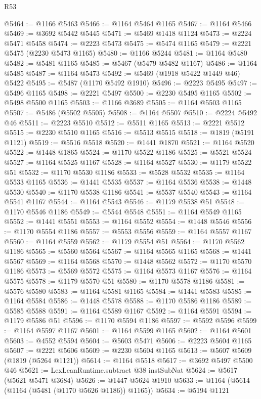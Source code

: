 \begin{lexlean}{R53}
\begin{coremodule}
@5464 := @1166 @5463
@5466 := @1164 @5464 @1165
@5467 := @1164 @5466
@5469 := @3692 @5442 @5445
@5471 := @5469 @1418 @1124
@5473 := @2224 @5471 @5458
@5474 := @2223 @5473
@5475 := @5474 @1165
@5479 := @2221 @5475 (@2230 @5473 @1165)
@5480 := @1166 @5244
@5481 := @1164 @5480
@5482 := @5481 @1165
@5485 := @5467 (@5479 @5482 @1167)
@5486 := @1164 @5485
@5487 := @1164 @5473
@5492 := @5469 (@1918 @5422 @1449 @46) @5422
@5495 := @5487 (@1170 @5492 @1910)
@5496 := @2223 @5495
@5497 := @5496 @1165
@5498 := @2221 @5497
@5500 := @2230 @5495 @1165
@5502 := @5498 @5500 @1165
@5503 := @1166 @3689
@5505 := @1164 @5503 @1165
@5507 := @5486 (@5502 @5505)
@5508 := @1164 @5507
@5510 := @2224 @5492 @46
@5511 := @2223 @5510
@5512 := @5511 @1165
@5513 := @2221 @5512
@5515 := @2230 @5510 @1165
@5516 := @5513 @5515
@5518 := @1819 (@5191 @1121)
@5519 := @5516 @5518
@5520 := @1441 @1870
@5521 := @1164 @5520
@5522 := @1448 @1865
@5524 := @1170 @5522 @1186
@5525 := @5521 @5524
@5527 := @1164 @5525 @1167
@5528 := @1164 @5527
@5530 := @1179 @5522 @51
@5532 := @1170 @5530 @1186
@5533 := @5528 @5532
@5535 := @1164 @5533 @1165
@5536 := @1441 @5535
@5537 := @1164 @5536
@5538 := @1448 @5530
@5540 := @1170 @5538 @1186
@5541 := @5537 @5540
@5543 := @1164 @5541 @1167
@5544 := @1164 @5543
@5546 := @1179 @5538 @51
@5548 := @1170 @5546 @1186
@5549 := @5544 @5548
@5551 := @1164 @5549 @1165
@5552 := @1441 @5551
@5553 := @1164 @5552
@5554 := @1448 @5546
@5556 := @1170 @5554 @1186
@5557 := @5553 @5556
@5559 := @1164 @5557 @1167
@5560 := @1164 @5559
@5562 := @1179 @5554 @51
@5564 := @1170 @5562 @1186
@5565 := @5560 @5564
@5567 := @1164 @5565 @1165
@5568 := @1441 @5567
@5569 := @1164 @5568
@5570 := @1448 @5562
@5572 := @1170 @5570 @1186
@5573 := @5569 @5572
@5575 := @1164 @5573 @1167
@5576 := @1164 @5575
@5578 := @1179 @5570 @51
@5580 := @1170 @5578 @1186
@5581 := @5576 @5580
@5583 := @1164 @5581 @1165
@5584 := @1441 @5583
@5585 := @1164 @5584
@5586 := @1448 @5578
@5588 := @1170 @5586 @1186
@5589 := @5585 @5588
@5591 := @1164 @5589 @1167
@5592 := @1164 @5591
@5594 := @1179 @5586 @51
@5596 := @1170 @5594 @1186
@5597 := @5592 @5596
@5599 := @1164 @5597 @1167
@5601 := @1164 @5599 @1165
@5602 := @1164 @5601
@5603 := @4552 @5594
@5604 := @5603 @5471
@5606 := @2223 @5604 @1165
@5607 := @2221 @5606
@5609 := @2230 @5604 @1165
@5613 := @5607 @5609 (@1819 (@5264 @1121))
@5614 := @1164 @5518
@5617 := @3692 @5497 @5500 @46
@5621 := LexLeanRuntime.subtract @38 instSubNat
@5624 := @5617 (@5621 @5471 @3684)
@5626 := @1447 @5624 @1910
@5633 := @1164 (@5614 (@1164 (@5481 (@1170 @5626 @1186)) @1165))
@5634 := @5194 @1121

\end{coremodule}
\end{lexlean}
